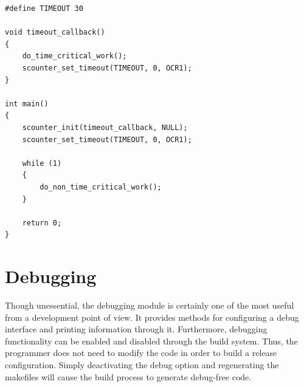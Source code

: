 
\lstset{
	language=C, numbers=none, caption=Time critical action snippet,
	label=lst:scounter_snippet
}
\begin{lstlisting}
#define TIMEOUT	30

void timeout_callback()
{
	do_time_critical_work();
	scounter_set_timeout(TIMEOUT, 0, OCR1);
}

int main()
{
	scounter_init(timeout_callback, NULL);
	scounter_set_timeout(TIMEOUT, 0, OCR1);

	while (1)
	{
		do_non_time_critical_work();
	}

	return 0;
}
\end{lstlisting}

\section{Debugging}

Though unessential, the debugging module is certainly one of the most useful from a development point of view.
It provides methods for configuring a debug interface and printing information
through it. Furthermore, debugging functionality can be enabled and disabled
through the build system. Thus, the programmer does not need to modify the code
in order to build a release configuration. Simply deactivating the debug
option and regenerating the makefiles will cause the build process to generate
debug-free code.


